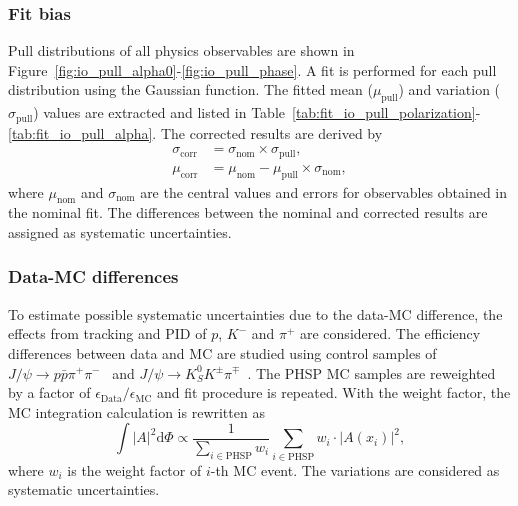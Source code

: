 \subsubsection{Fit bias}
Pull distributions of all physics observables are shown in Figure~\ref{fig:io_pull_alpha0}-\ref{fig:io_pull_phase}. A fit is performed for each pull distribution using the Gaussian function. The fitted mean ($\mu_\mathrm{pull}$) and variation ($\sigma_{\mathrm{pull}}$) values are extracted and listed in Table~\ref{tab:fit_io_pull_polarization}-\ref{tab:fit_io_pull_alpha}. The corrected results are derived by
\begin{equation}
    \label{eq:IO_corr}
    \begin{split}
        \sigma_\mathrm{corr} &= \sigma_\mathrm{nom} \times \sigma_\mathrm{pull}, \\
        \mu_\mathrm{corr}    &= \mu_\mathrm{nom} - \mu_\mathrm{pull} \times \sigma_\mathrm{nom},
    \end{split}
\end{equation}
where $\mu_\mathrm{nom}$ and $\sigma_\mathrm{nom}$ are the central values and errors for observables obtained in the nominal fit. The differences between the nominal and corrected results are assigned as systematic uncertainties. 

\subsubsection{Data-MC differences}
To estimate possible systematic uncertainties due to the data-MC difference, the effects from tracking and PID of $p$, $K^-$ and $\pi^+$ are considered. The efficiency differences between data and MC are studied using control samples of $J/\psi \to p\bar{p}\pi^+\pi^-$~\cite{trkPID1} and $J/\psi \to K_S^0K^{\pm}\pi^{\mp}$~\cite{trkPID2}. The PHSP MC samples are reweighted by a factor of $\epsilon_\mathrm{Data}/\epsilon_\mathrm{MC}$ and fit procedure is repeated. With the weight factor, the MC integration calculation is rewritten as
\begin{equation}\label{eq:mc_weight_integration}
    \int|A|^2\mathrm{d}\Phi \varpropto \frac{1}{\sum_{i\in\mathrm{PHSP}}w_i}\sum_{i \in \mathrm{{PHSP}}} w_i \cdot |A(x_i)|^2,
\end{equation}
where $w_i$ is the weight factor of $i$-th MC event. The variations are considered as systematic uncertainties.

